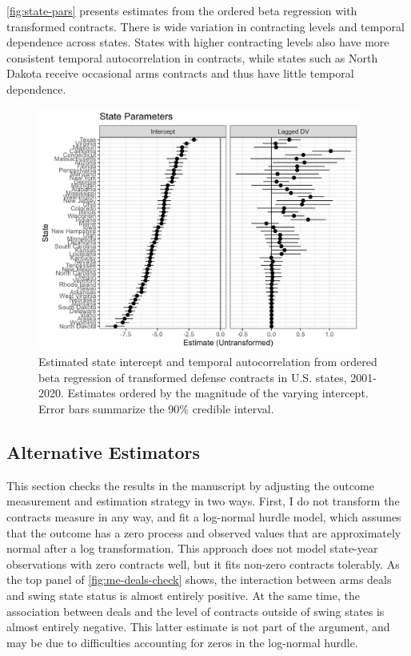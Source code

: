 \documentclass[12pt]{article}
\begin{document}
\autoref{fig:state-pars} presents estimates from the ordered beta regression with transformed contracts. 
There is wide variation in contracting levels and temporal dependence across states. 
States with higher contracting levels also have more consistent temporal autocorrelation in contracts, while states such as North Dakota receive occasional arms contracts and thus have little temporal dependence. 

\begin{figure}[htpb]
	\centering
		\includegraphics[width=0.95\textwidth]{state-pars.png}
	\caption{Estimated state intercept and temporal autocorrelation from ordered beta regression of transformed defense contracts in U.S. states, 2001-2020. Estimates ordered by the magnitude of the varying intercept. Error bars summarize the 90\% credible interval.}
	\label{fig:state-pars}
\end{figure}


\subsection{Alternative Estimators}

This section checks the results in the manuscript by adjusting the outcome measurement and estimation strategy in two ways.
First, I do not transform the contracts measure in any way, and fit a log-normal hurdle model, which assumes that the outcome has a zero process and observed values that are approximately normal after a log transformation. 
This approach does not model state-year observations with zero contracts well, but it fits non-zero contracts tolerably. 
As the top panel of \autoref{fig:me-deals-check} shows, the interaction between arms deals and swing state status is almost entirely positive.
At the same time, the association between deals and the level of contracts outside of swing states is almost entirely negative. 
This latter estimate is not part of the argument, and may be due to difficulties accounting for zeros in the log-normal hurdle. 
 
\end{document}
